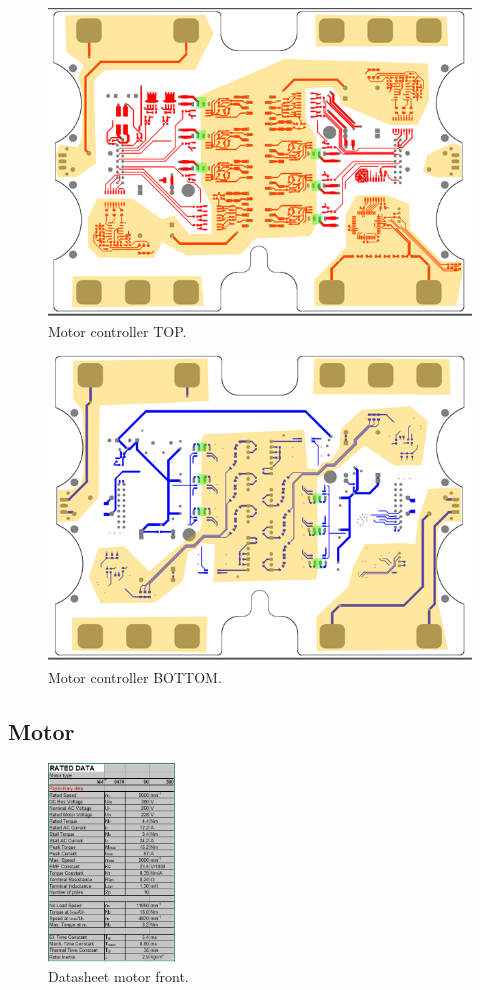 \begin{figure}[H]
	\centering
	\includegraphics[width=.7\textwidth]{./img/mc-top.png}
	\caption{Motor controller TOP.}
	\label{app:mc-top}
\end{figure}

\begin{figure}[H]
	\centering
	\includegraphics[width=.7\textwidth]{./img/mc-bot.png}
	\caption{Motor controller BOTTOM.}
	\label{app:mc-bot}
\end{figure}

\subsection{Motor}

\begin{figure}[H]
	\centering
	\includegraphics[width=0.3\textwidth]{./img/app-mf.png}
	\caption{Datasheet motor front.}
	\label{app:mf}
\end{figure}

